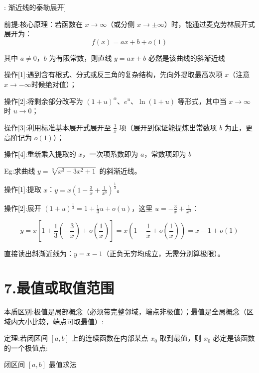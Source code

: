 \documentclass[11pt,a4paper,UTF8]{ctexart}
\begin{document}
\begin{thmbox}[原理[3]: 渐近线的泰勒展开]

前提:核心原理：若函数在 $x \to \infty$（或分侧 $x \to \pm\infty$）时，能通过麦克劳林展开式展开为：
\begin{equation*}
f(x) = ax + b + o(1)
\end{equation*}


其中 $a \neq 0$，$b$ 为有限常数，则直线 $y = ax + b$ 必然是该曲线的斜渐近线

操作[1]:遇到含有根式、分式或反三角的复杂结构，先向外提取最高次项 $x$（注意$x \to -\infty$时候绝对值）；

操作[2]:将剩余部分改写为 $(1 + u)^\alpha$、$e^u$、$\ln(1 + u)$ 等形式，其中当 $x \to \infty$ 时 $u \to 0$；

操作[3]:利用标准基本展开式展开至 $\frac{1}{x}$ 项（展开到保证能提炼出常数项 $b$ 为止，更高阶记为 $o(1)$）；

操作[4]:重新乘入提取的 $x$，一次项系数即为 $a$，常数项即为 $b$

Eg:求曲线 $y = \sqrt[3]{x^3 - 3x^2 + 1}$ 的斜渐近线。

  操作[1]:提取 $x$：$y = x \left(1 - \frac{3}{x} + \frac{1}{x^3}\right)^{\frac{1}{3}}$。

  操作[2]:展开 $(1 + u)^{\frac{1}{3}} = 1 + \frac{1}{3}u + o(u)$，这里 $u = -\frac{3}{x} + \frac{1}{x^3}$：

  	
\begin{equation*}
y = x \left[1 + \frac{1}{3}\left(-\frac{3}{x}\right) + o\left(\frac{1}{x}\right)\right] = x \left(1 - \frac{1}{x} + o\left(\frac{1}{x}\right)\right) = x - 1 + o(1)
\end{equation*}


  直接读出斜渐近线为：\textit{}$y = x - 1$\textit{}（正负无穷均成立，无需分别算极限）。



\end{thmbox}

\section{7.最值或取值范围}

本质区别:极值是局部概念（必须带完整邻域，端点非极值）；最值是全局概念（区域内大小比较，端点可取最值）:

定理:若闭区间 $[a, b]$ 上的连续函数在内部某点 $x_0$ 取到最值，则 $x_0$ 必定是该函数的一个极值点:

\textit{}闭区间 $[a, b]$ 最值求法\textit{}
\end{document}
